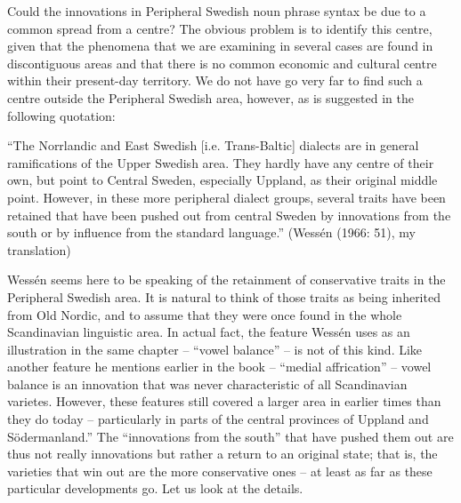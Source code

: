 \begin{styleBodytextC}
Could the innovations in Peripheral Swedish noun phrase syntax be due to a common spread from a centre? The obvious problem is to identify this centre, given that the phenomena that we are examining in several cases are found in discontiguous areas and that there is no common economic and cultural centre within their present-day territory. We do not have go very far to find such a centre outside the Peripheral Swedish area, however, as is suggested in the following quotation: 

\end{styleBodytextC}

\begin{styleBlockQuote}
“The Norrlandic and East Swedish [i.e. Trans-Baltic] dialects are in general ramifications of the Upper Swedish area. They hardly have any centre of their own, but point to Central Sweden, especially Uppland, as their original middle point. However, in these more peripheral dialect groups, several traits have been retained that have been pushed out from central Sweden by innovations from the south or by influence from the standard language.” (Wessén (1966: 51), my translation)

\end{styleBlockQuote}

\begin{styleBodyTextFirst}
Wessén seems here to be speaking of the retainment of conservative traits in the Peripheral Swedish area. It is natural to think of those traits as being inherited from Old Nordic, and to assume that they were once found in the whole Scandinavian linguistic area. In actual fact, the feature Wessén uses as an illustration in the same chapter – “vowel balance” – is not of this kind. Like another feature he mentions earlier in the book – “medial affrication” – vowel balance is an innovation that was never characteristic of all Scandinavian varietes.  However, these features still covered a larger area in earlier times than they do today – particularly in parts of the central provinces of Uppland and Södermanland.” The “innovations from the south” that have pushed them out are thus not really innovations but rather a return to an original state; that is, the varieties that win out are the more conservative ones – at least as far as these particular developments go. Let us look at the details.

\end{styleBodyTextFirst}


